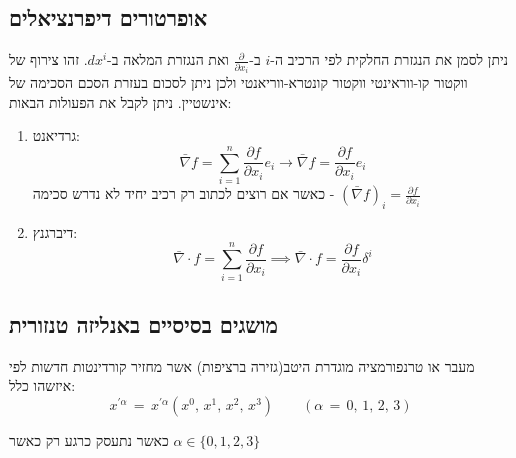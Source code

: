 \documentclass{tstextbook}
\begin{document}
\subsection{אופרטורים דיפרנציאלים}

ניתן לסמן את הנגזרת החלקית לפי הרכיב ה-\(i\) ב-\(\frac{\partial }{\partial x_{i}}\) ואת הנגזרת המלאה ב-\(dx^i\). זהו צירוף של ווקטור קו-ווראינטי ווקטור קונטרא-ווריאנטי ולכן ניתן לסכום בעזרת הסכם הסכימה של אינשטיין. ניתן לקבל את הפעולות הבאות:

\begin{enumerate}
  \item גרדיאנט: 
$$\bar{\nabla} f = \sum_{i=1}^n \frac{\partial f}{\partial x_{i}} e_{i}\to \bar{\nabla} f=\frac{\partial f}{\partial x_{i}} e_{i}$$
כאשר אם רוצים לכתוב רק רכיב יחיד לא נדרש סכימה - \(\left( \bar{\nabla}f \right)_{i}=\frac{\partial f}{\partial x_{i}}\)


  \item דיברגנץ: 
$$\bar{\nabla} \cdot f = \sum_{i=1}^n \frac{\partial f}{\partial x_{i}} \implies \bar{\nabla} \cdot f=\frac{\partial f}{\partial x_{i}} \delta^i$$


\end{enumerate}
\subsection{מושגים בסיסיים באנליזה טנזורית}

\begin{definition}
מעבר או טרנפורמציה מוגדרת היטב(גזירה ברציפות) אשר מחזיר קורדינטות חדשות לפי איזשהו כלל:
$$x^{\prime\alpha}\,=\,x^{\prime\alpha}(x^{0},\,x^{1},\,x^{2},\,x^{3})\qquad(\alpha\,=\,0,\,1,\,2,\,3)$$

\end{definition}
כאשר נתעסק כרגע רק כאשר \(\alpha \in \{ 0,1,2,3 \}\)
\end{document}
